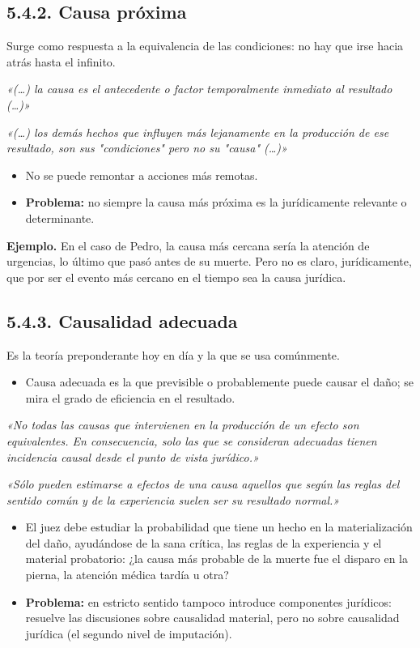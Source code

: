 \subsection{5.4.2. Causa próxima}
Surge como respuesta a la equivalencia de las condiciones: no hay que irse hacia atrás hasta el infinito.

\begin{cita}
\textit{«(…) la causa es el antecedente o factor temporalmente inmediato al resultado (…)»}
\par
\textit{«(…) los demás hechos que influyen más lejanamente en la producción de ese resultado, son sus "condiciones" pero no su "causa" (…)»}
\end{cita}
\begin{itemize}
\item No se puede remontar a acciones más remotas.
\item \textbf{Problema:} no siempre la causa más próxima es la jurídicamente relevante o determinante.
\end{itemize}
\begin{ejemplo}
\textcolor[HTML]{4F6228}{\textbf{Ejemplo. }}En el caso de Pedro, la causa más cercana sería la atención de urgencias, lo último que pasó antes de su muerte. Pero no es claro, jurídicamente, que por ser el evento más cercano en el tiempo sea la causa jurídica.
\end{ejemplo}
\subsection{5.4.3. Causalidad adecuada}
Es la teoría preponderante hoy en día y la que se usa comúnmente.

\begin{itemize}
\item Causa adecuada es la que previsible o probablemente puede causar el daño; se mira el grado de eficiencia en el resultado.
\end{itemize}
\begin{cita}
\textit{«No todas las causas que intervienen en la producción de un efecto son equivalentes. En consecuencia, solo las que se consideran adecuadas tienen incidencia causal desde el punto de vista jurídico.»}
\par
\textit{«Sólo pueden estimarse a efectos de una causa aquellos que según las reglas del sentido común y de la experiencia suelen ser su resultado normal.»}
\end{cita}
\begin{itemize}
\item El juez debe estudiar la probabilidad que tiene un hecho en la materialización del daño, ayudándose de la sana crítica, las reglas de la experiencia y el material probatorio: ¿la causa más probable de la muerte fue el disparo en la pierna, la atención médica tardía u otra?
\item \textbf{Problema:} en estricto sentido tampoco introduce componentes jurídicos: resuelve las discusiones sobre causalidad material, pero no sobre causalidad jurídica (el segundo nivel de imputación).
\end{itemize}
